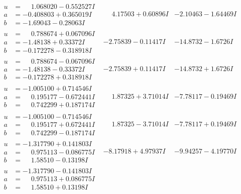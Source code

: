 \documentclass[1p]{elsarticle_modified}
\theoremstyle{definition}
\begin{document}
$$\begin{array}{c|c|c}
\begin{aligned}
u &= \phantom{-}1.068020 - 0.552527 I \\
a &= -0.408803 + 0.365019 I \\
b &= -1.69043 - 0.28063 I\end{aligned}
 & \phantom{-}4.17503 + 0.60896 I & -2.10463 - 1.64469 I \\ \hline\begin{aligned}
u &= \phantom{-}0.788674 + 0.067096 I \\
a &= -1.48138 + 0.33372 I \\
b &= -0.172278 - 0.318918 I\end{aligned}
 & -2.75839 - 0.11417 I & -14.8732 - 1.6726 I \\ \hline\begin{aligned}
u &= \phantom{-}0.788674 - 0.067096 I \\
a &= -1.48138 - 0.33372 I \\
b &= -0.172278 + 0.318918 I\end{aligned}
 & -2.75839 + 0.11417 I & -14.8732 + 1.6726 I \\ \hline\begin{aligned}
u &= -1.005100 + 0.714546 I \\
a &= \phantom{-}0.195177 - 0.672441 I \\
b &= \phantom{-}0.742299 + 0.187174 I\end{aligned}
 & \phantom{-}1.87325 + 3.71014 I & -7.78117 - 0.19469 I \\ \hline\begin{aligned}
u &= -1.005100 - 0.714546 I \\
a &= \phantom{-}0.195177 + 0.672441 I \\
b &= \phantom{-}0.742299 - 0.187174 I\end{aligned}
 & \phantom{-}1.87325 - 3.71014 I & -7.78117 + 0.19469 I \\ \hline\begin{aligned}
u &= -1.317790 + 0.141803 I \\
a &= \phantom{-}0.975113 - 0.086775 I \\
b &= \phantom{-}1.58510 - 0.13198 I\end{aligned}
 & -8.17918 + 4.97937 I & -9.94257 - 4.19770 I \\ \hline\begin{aligned}
u &= -1.317790 - 0.141803 I \\
a &= \phantom{-}0.975113 + 0.086775 I \\
b &= \phantom{-}1.58510 + 0.13198 I\end{aligned}

\end{array}$$
\end{document}
